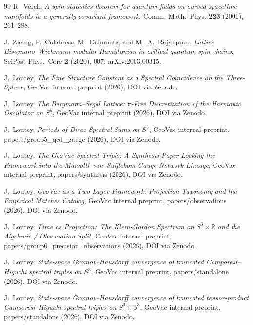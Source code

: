 \documentclass[11pt,a4paper]{article}
\theoremstyle{plain}
\theoremstyle{definition}
\newcommand{\sthree}{S^{3}}
\begin{document}
\begin{thebibliography}{99}
R.~Verch,
\newblock \emph{A spin-statistics theorem for quantum fields on
curved spacetime manifolds in a generally covariant framework},
\newblock Comm.~Math.~Phys. \textbf{223} (2001), 261--288.

J.~Zhang, P.~Calabrese, M.~Dalmonte, and M.~A.~Rajabpour,
\newblock \emph{Lattice Bisognano--Wichmann modular Hamiltonian in
critical quantum spin chains},
\newblock SciPost Phys.~Core \textbf{2} (2020), 007;
\newblock arXiv:2003.00315.

J.~Loutey,
\newblock \emph{The Fine Structure Constant as a Spectral Coincidence
on the Three-Sphere},
\newblock GeoVac internal preprint (2026),
DOI via Zenodo.

J.~Loutey,
\newblock \emph{The Bargmann--Segal Lattice: $\pi$-Free Discretization
of the Harmonic Oscillator on $S^5$},
\newblock GeoVac internal preprint (2026), DOI via Zenodo.

J.~Loutey,
\newblock \emph{Periods of Dirac Spectral Sums on $S^3$},
\newblock GeoVac internal preprint, papers/group5\_qed\_gauge (2026),
DOI via Zenodo.

J.~Loutey,
\newblock \emph{The GeoVac Spectral Triple: A Synthesis Paper Locking
the Framework into the Marcolli--van~Suijlekom Gauge-Network Lineage},
\newblock GeoVac internal preprint, papers/synthesis (2026),
DOI via Zenodo.

J.~Loutey,
\newblock \emph{GeoVac as a Two-Layer Framework: Projection Taxonomy
and the Empirical Matches Catalog},
\newblock GeoVac internal preprint, papers/observations (2026),
DOI via Zenodo.

J.~Loutey,
\newblock \emph{Time as Projection:\ The Klein-Gordon Spectrum on
$S^3 \times \mathbb{R}$ and the Algebraic / Observation Split},
\newblock GeoVac internal preprint, papers/group6\_precision\_observations
(2026), DOI via Zenodo.

J.~Loutey,
\newblock \emph{State-space Gromov--Hausdorff convergence of
truncated Camporesi--Higuchi spectral triples on $S^3$},
\newblock GeoVac internal preprint, papers/standalone (2026),
DOI via Zenodo.

J.~Loutey,
\newblock \emph{State-space Gromov--Hausdorff convergence of truncated
tensor-product Camporesi--Higuchi spectral triples on $\sthree \times \sthree$},
\newblock GeoVac internal preprint, papers/standalone (2026),
DOI via Zenodo.


\end{thebibliography}
\end{document}
